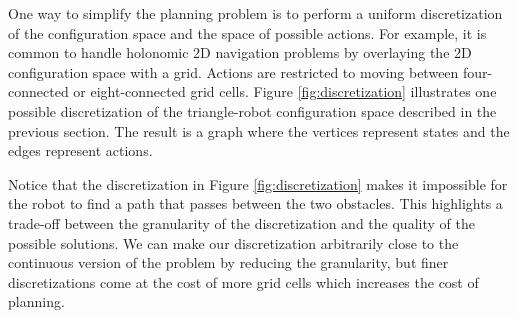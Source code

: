 One way to simplify the planning problem is to perform a uniform
discretization of the configuration space and the space of possible
actions.  For example, it is common to handle holonomic 2D navigation
problems by overlaying the 2D configuration space with a grid.  Actions
are restricted to moving between four-connected or eight-connected
grid cells.  Figure \ref{fig:discretization} illustrates one possible
discretization of the triangle-robot configuration space described in
the previous section.  The result is a graph where the vertices
represent states and the edges represent actions.

Notice that the discretization in Figure \ref{fig:discretization}
makes it impossible for the robot to find a path that passes between
the two obstacles.  This highlights a trade-off between the
granularity of the discretization and the quality of the possible
solutions.  We can make our discretization arbitrarily close to the
continuous version of the problem by reducing the granularity, but
finer discretizations come at the cost of more grid cells which
increases the cost of planning.


